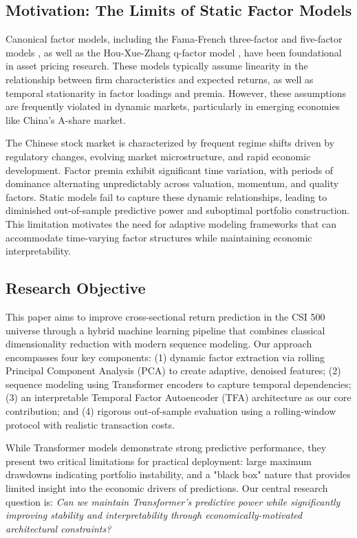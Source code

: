 \documentclass[12pt]{article}
\begin{document}
\subsection{Motivation: The Limits of Static Factor Models}

Canonical factor models, including the Fama-French three-factor \cite{fama1993common} and five-factor models \cite{fama2015five}, as well as the Hou-Xue-Zhang q-factor model \cite{hou2015digesting}, have been foundational in asset pricing research. These models typically assume linearity in the relationship between firm characteristics and expected returns, as well as temporal stationarity in factor loadings and premia. However, these assumptions are frequently violated in dynamic markets, particularly in emerging economies like China's A-share market.

The Chinese stock market is characterized by frequent regime shifts driven by regulatory changes, evolving market microstructure, and rapid economic development. Factor premia exhibit significant time variation, with periods of dominance alternating unpredictably across valuation, momentum, and quality factors. Static models fail to capture these dynamic relationships, leading to diminished out-of-sample predictive power and suboptimal portfolio construction. This limitation motivates the need for adaptive modeling frameworks that can accommodate time-varying factor structures while maintaining economic interpretability.

\subsection{Research Objective}

This paper aims to improve cross-sectional return prediction in the CSI 500 universe through a hybrid machine learning pipeline that combines classical dimensionality reduction with modern sequence modeling. Our approach encompasses four key components: (1) dynamic factor extraction via rolling Principal Component Analysis (PCA) to create adaptive, denoised features; (2) sequence modeling using Transformer encoders to capture temporal dependencies; (3) an interpretable Temporal Factor Autoencoder (TFA) architecture as our core contribution; and (4) rigorous out-of-sample evaluation using a rolling-window protocol with realistic transaction costs.

While Transformer models demonstrate strong predictive performance, they present two critical limitations for practical deployment: large maximum drawdowns indicating portfolio instability, and a "black box" nature that provides limited insight into the economic drivers of predictions. Our central research question is: \textit{Can we maintain Transformer's predictive power while significantly improving stability and interpretability through economically-motivated architectural constraints?}
\end{document}
